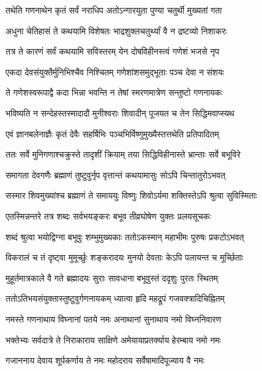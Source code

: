 \twolineshloka
{तथेति गणनाथेन कृतं सर्वं नराधिप}
{अतोऽन्गारयुता पुण्या चतुर्थी मुख्यतां गता} %

\twolineshloka
{अधुना चेतिहासं ते कथयामि विशेषतः}
{भाद्रशुक्लचतुर्थ्यां वै न द्रष्टव्यो निशाकरः} %

\twolineshloka
{तत्र ते कारणं सर्वं कथयामि सविस्तरम्}
{येन दोषविहीनस्त्वं गणेशं भजसे नृप} %

\twolineshloka
{एकदा देवसंयुक्तैर्मुनिभिश्चैव निश्चितम्}
{गणेशांशसमुद्भूताः पञ्च देवा न संशयः} %

\twolineshloka
{ते गणेशस्वरूपाद्वै कदा भिन्ना भवन्ति न}
{तेषां स्मरणमात्रेण सन्तुष्टो गणनायकः} %

\twolineshloka
{भविष्यति न सन्देहस्तस्मादादौ मुनीश्वराः}
{शिवादीन् पूजयत च तेन सिद्धिमवाप्स्यथ} %

\twolineshloka
{एवं ज्ञानबलेनाज्ञैः कृतं देवैः सहर्षिभिः}
{पञ्चभिर्विष्णुमुख्यैस्तत्तथेति प्रतिपादितम्} %

\twolineshloka
{ततः सर्वे मुनिगणाश्चक्रुस्ते तादृशीं क्रियाम्}
{तया सिद्धिविहीनास्ते भ्रान्ताः सर्वे बभूविरे} %

\twolineshloka
{समागता देवगणैः ब्रह्माणं तुष्टुवुर्नृप}
{वृत्तान्तं कथयामासुः सोऽपि चिन्तातुरोऽभवत्} %

\twolineshloka
{सस्मार शिवमुख्यांश्च ब्रह्माणं ते समाययुः}
{विष्णुः शिवोऽर्यमा शक्तिस्तेऽपि श्रुत्वा सुविस्मिताः} %

\twolineshloka
{एतस्मिन्नन्तरे तत्र शब्दः सर्वभयङ्करः}
{बभूव तीव्रघोषेण युक्तः प्रलयसूचकः} %

\twolineshloka
{शब्दं श्रुत्वा भयोद्विग्ना बभूवुः शम्भुमुख्यकाः}
{ततोऽकस्मान् महाभीमः पुरुषः प्रकटोऽभवत्} %

\twolineshloka
{विकरालं च तं दृष्ट्वा मुमूर्च्छुः शङ्करादयः}
{मुनयो देवताः केऽपि पलायन्त च मूर्च्छिताः} %

\twolineshloka
{मुहूर्तमात्रकाले वै गते ब्रह्मादयः सुराः}
{सावधाना बभूवुस्तं ददृशुः पुरतः स्थितम्} %

\twolineshloka
{ततोऽतिभयसंयुक्तास्तुष्टुवुर्गणनायकम्}
{ध्यात्वा हृदि महद्रूपं गजवक्त्रादिचिह्नितम्} %


\twolineshloka
{नमस्ते गणनाथाय विघ्नानां पतये नमः}
{अनाथानां सुनाथाय नमो विघ्ननिवारण} %

\twolineshloka
{भक्तेभ्यः सर्वदात्रे ते निराकाराय साक्षिणे}
{अमेयायाप्रतर्क्याय हेरम्बाय नमो नमः} %

\twolineshloka
{गजाननाय देवाय शूर्पकर्णाय ते नमः}
{महोदराय सर्वेषामादिपूज्याय वै नमः} %

